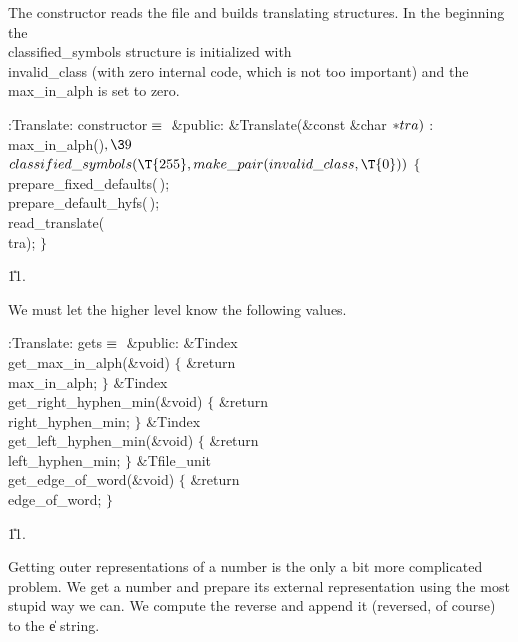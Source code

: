 The constructor reads the file and builds translating structures.
In the beginning the \\{classified\_symbols} structure is initialized with
\\{invalid\_class} (with zero internal code, which is not too important)
and the \\{max\_in\_alph} is set to zero.

\Y\B\4:Translate: constructor\X${}\equiv{}$\6
\4\&{public}:\6
\&{Translate}(\&{const} \&{char} ${}{*}\\{tra}){}$\1\1\2\2\6
: \\{max\_in\_alph}()${},\39{}$ ${}\\{classified\_symbols}(\T{255},\39%
\\{make\_pair}(\\{invalid\_class},\39\T{0})){}$ ${}\{{}$\1\6
\\{prepare\_fixed\_defaults}(\,);\6
\\{prepare\_default\_hyfs}(\,);\6
\\{read\_translate}(\\{tra});\6
\4${}\}{}$\2\par
\U11.\fi

We must let the higher level know the following values.

\Y\B\4:Translate: gets\X${}\equiv{}$\6
\4\&{public}:\6
\&{Tindex} \\{get\_max\_in\_alph}(\&{void})\1\1\2\2\6
${}\{{}$\1\6
\&{return} \\{max\_in\_alph};\6
\4${}\}{}$\2\7
\&{Tindex} \\{get\_right\_hyphen\_min}(\&{void})\1\1\2\2\6
${}\{{}$\1\6
\&{return} \\{right\_hyphen\_min};\6
\4${}\}{}$\2\7
\&{Tindex} \\{get\_left\_hyphen\_min}(\&{void})\1\1\2\2\6
${}\{{}$\1\6
\&{return} \\{left\_hyphen\_min};\6
\4${}\}{}$\2\7
\&{Tfile\_unit} \\{get\_edge\_of\_word}(\&{void})\1\1\2\2\6
${}\{{}$\1\6
\&{return} \\{edge\_of\_word};\6
\4${}\}{}$\2\par
\U11.\fi

Getting outer representations of a number is the only a bit more
complicated problem. We get a number and prepare its external
representation using the most stupid way we can. We compute the reverse
and append it (reversed, of course) to the \|e string.

